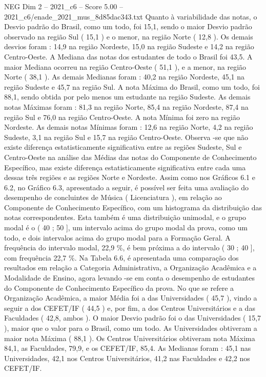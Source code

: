 \begin{textsample}{NEG Dim 2 – 2021\_c6 – Score 5.00 – 2021\_c6/enade\_2021\_mus\_8d85dac343.txt}
Quanto à variabilidade das notas, o Desvio padrão do Brasil, como um todo, foi 15,1, sendo o maior Desvio padrão observado na região Sul ( 15,1 ) e o menor, na região Norte ( 12,8 ).
Os demais desvios foram : 14,9 na região Nordeste, 15,0 na região Sudeste e 14,2 na região Centro-Oeste.
A Mediana das notas dos estudantes de todo o Brasil foi 43,5.
A maior Mediana ocorreu na região Centro-Oeste ( 51,1 ), e a menor, na região Norte ( 38,1 ).
As demais Medianas foram : 40,2 na região Nordeste, 45,1 na região Sudeste e 45,7 na região Sul.
A nota Máxima do Brasil, como um todo, foi 88,1, sendo obtida por pelo menos um estudante na região Sudeste.
As demais notas Máximas foram : 81,3 na região Norte, 85,4 na região Nordeste, 87,4 na região Sul e 76,0 na região Centro-Oeste.
A nota Mínima foi zero na região Nordeste.
As demais notas Mínimas foram : 12,6 na região Norte, 4,2 na região Sudeste, 3,1 na região Sul e 15,7 na região Centro-Oeste.
Observa -se que não existe diferença estatisticamente significativa entre as regiões Sudeste, Sul e Centro-Oeste na análise das Médias das notas do Componente de Conhecimento Específico, mas existe diferença estatisticamente significativa entre cada uma dessas três regiões e as regiões Norte e Nordeste.
Assim como nos Gráficos 6.1 e 6.2, no Gráfico 6.3, apresentado a seguir, é possível ser feita uma avaliação do desempenho de concluintes de Música ( Licenciatura ), em relação ao Componente de Conhecimento Específico, com um histograma da distribuição das notas correspondentes.
Esta também é uma distribuição unimodal, e o grupo modal é o ( 40 ; 50 ], um intervalo acima do grupo modal da prova, como um todo, e dois intervalos acima do grupo modal para a Formação Geral.
A frequência do intervalo modal, 22,9 \%, é bem próxima a do intervalo ( 30 ; 40 ], com frequência 22,7 \%.
Na Tabela 6.6, é apresentada uma comparação dos resultados em relação a Categoria Administrativa, a Organização Acadêmica e a Modalidade de Ensino, agora levando -se em conta o desempenho de estudantes do Componente de Conhecimento Específico da prova.
No que se refere a Organização Acadêmica, a maior Média foi a das Universidades ( 45,7 ), vindo a seguir a dos CEFET/IF ( 44,5 ) e, por fim, a dos Centros Universitários e a das Faculdades ( 42,8, ambos ).
O maior Desvio padrão foi o das Universidades ( 15,7 ), maior que o valor para o Brasil, como um todo.
As Universidades obtiveram a maior nota Máxima ( 88,1 ).
Os Centros Universitários obtiveram nota Máxima 84,1, as Faculdades, 79,9, e os CEFET/IF, 85,4.
As Medianas foram : 45,1 nas Universidades, 42,1 nos Centros Universitários, 41,2 nas Faculdades e 42,2 nos CEFET/IF.

\end{textsample}
